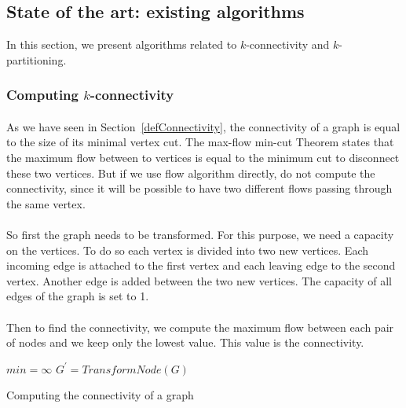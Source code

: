 \subsection{State of the art: existing algorithms}
In this section, we present algorithms related to
$k$-connectivity and $k$-partitioning.

\subsubsection{Computing $k$-connectivity}
\paragraph{}
As we have seen in Section~\ref{defConnectivity}, the connectivity of a graph is equal to
the size of its minimal vertex cut. The max-flow min-cut Theorem states
that the maximum flow between to vertices is equal to the minimum cut to 
disconnect these two vertices. But if we use flow algorithm directly, 
do not compute the connectivity, since it will be possible to have two different
flows passing through the same vertex.

\paragraph{}
So first the graph needs to be transformed. For this purpose, we need a capacity
on the vertices.
To do so each vertex is divided into two new vertices. Each incoming edge is
attached to the first vertex and each leaving edge to the second vertex. Another
edge is added between the two new vertices.
The capacity of all edges of the graph is set to 1.

\paragraph{}
Then to find the connectivity, we compute the maximum flow between each pair of
nodes and we keep only the lowest value. This value is the connectivity.


\begin{algorithm}[!h]
    $min = \infty$\;
    $G^{'} = TransformNode(G)$\;
    \;
    \caption{Computing the connectivity of a graph}
\end{algorithm}


